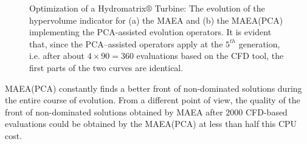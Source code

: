 \begin{figure}[h!]
\begin{minipage}[b]{1\linewidth}
 \centering
\end{minipage}
\caption{Optimization of a Hydromatrix$\circledR$ Turbine: The evolution of the hypervolume indicator for (a) the MAEA and (b) the MAEA(PCA) implementing the PCA-assisted evolution operators. It is evident that, since the PCA--assisted operators apply at the $5^{th}$ generation, i.e. after about $4\!\times\!90\!=\!360$ evaluations based on the CFD tool, the first parts of the two curves are identical.}
\label{hyp_matrix}
\end{figure}
 
MAEA(PCA) constantly finds a better front of non-dominated solutions during the entire course of evolution. From a different point of view, the quality of the front of non-dominated solutions obtained by MAEA after $2000$ CFD-based evaluations could be obtained by the MAEA(PCA) at less than half this CPU cost. 

